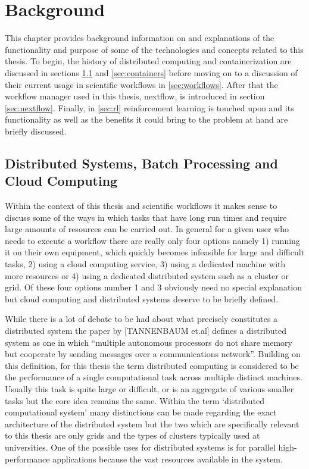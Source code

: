 
\cleardoublepage
\chapter{Background}
\label{cha:background}


This chapter provides background information on and explanations of the functionality and purpose of some of the technologies and concepts related to this thesis.  To begin, the history of distributed computing and containerization are discussed in sections \ref{sec:dist-computing} and \ref{sec:containers} before moving on to a discussion of their current usage in scientific workflows in \ref{sec:workflows}. After that the workflow manager used in this thesis, nextflow, is introduced in section \ref{sec:nextflow}. Finally, in \ref{sec:rl} reinforcement learning is touched upon and its functionality as well as the benefits it could bring to the problem at hand are briefly discussed.

\section{Distributed Systems, Batch Processing and Cloud Computing}
\label{sec:dist-computing}

Within the context of this thesis and scientific workflows it makes sense to discuss some of the ways in which tasks that have long run times and require large amounts of resources can be carried out. In general for a given user who needs to execute a workflow there are really only four options namely 1) running it on their own equipment, which quickly becomes infeasible for large and difficult tasks, 2) using a cloud computing service, 3) using a dedicated machine with more resources or 4) using a dedicated distributed system such as a cluster or grid. Of these four options number 1 and 3 obviously need no special explanation but cloud computing and distributed systems deserve to be briefly defined.

While there is a lot of debate to be had about what precisely constitutes a distributed system the paper by [TANNENBAUM et.al] defines a distributed system as one in which “multiple autonomous processors do not share memory but cooperate by sending messages over a communications network”. Building on this definition, for this thesis the term distributed computing is considered to be the performance of a single computational task across multiple distinct machines. Usually this task is quite large or difficult, or is an aggregate of various smaller tasks but the core idea remains the same. Within the term ‘distributed computational system’ many distinctions can be made regarding the exact architecture of the distributed system but the two which are specifically relevant to this thesis are only grids and the types of clusters typically used at universities.  One of the possible uses for distributed systems is for parallel high-performance applications because the vast resources available in the system.

